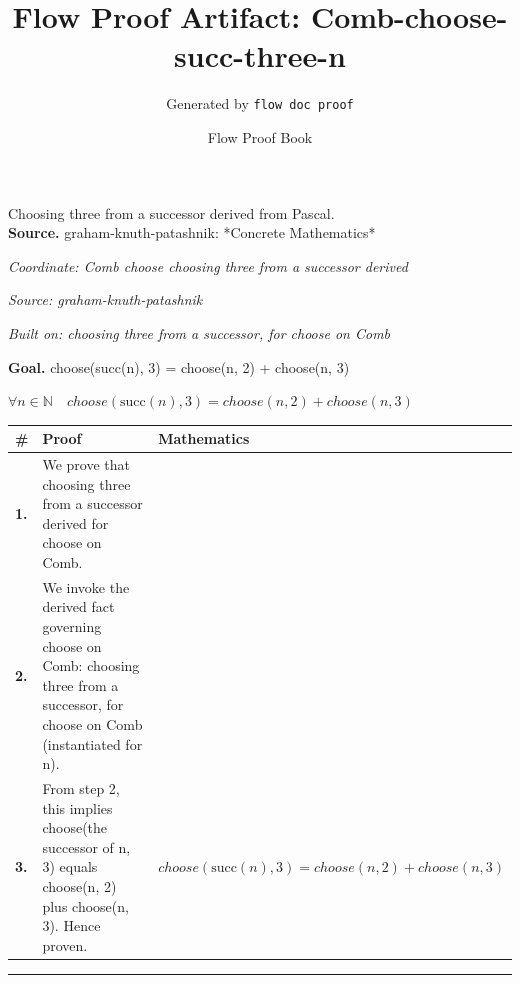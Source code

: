 \documentclass[11pt]{article}
\title{Flow Proof Artifact: Comb-choose-succ-three-n}
\author{Generated by \texttt{flow doc proof}}
\date{Flow Proof Book}
\theoremstyle{definition}
\begin{document}
\maketitle
Choosing three from a successor derived from Pascal.\\[0.5em]
\textbf{Source.} graham-knuth-patashnik: *Concrete Mathematics*\\[0.5em]
\bigskip
{}\par
\smallskip\noindent\textit{Coordinate: Comb \cdot choose \cdot choosing three from a successor derived}\par
\smallskip\noindent\textit{Source: graham-knuth-patashnik}\par
\smallskip\noindent\textit{Built on: choosing three from a successor, for choose on Comb}\par
\medskip
\noindent\textbf{Goal.} choose(succ(n), 3) = choose(n, 2) + choose(n, 3)\par
\noindent$\displaystyle \forall n \in \mathbb{N}\quad choose(\mathrm{succ}(n), 3) = choose(n, 2) + choose(n, 3)$\par
\medskip
\noindent
\begin{tabular}{@{} >{\raggedright\arraybackslash}p{} >{\raggedright\arraybackslash}p{} >{\raggedleft\arraybackslash}p{} @{}}
\textbf{\#} & \textbf{Proof} & \textbf{Mathematics} \\
\midrule
\textbf{1.} & We prove that choosing three from a successor derived for choose on Comb. & \\[0.45em]
\textbf{2.} & We invoke the derived fact governing choose on Comb: choosing three from a successor, for choose on Comb (instantiated for n). & \\[0.45em]
\textbf{3.} & From step 2, this implies choose(the successor of n, 3) equals choose(n, 2) plus choose(n, 3). Hence proven. & $\displaystyle choose(\mathrm{succ}(n), 3) = choose(n, 2) + choose(n, 3)$ \\[0.45em]
\bottomrule
\end{tabular}
\label{thm:Comb-choose-choosing_three_from_a_successor_derived}
\par\medskip\hrule
\end{document}
